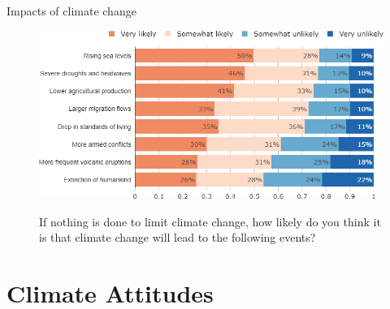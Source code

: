 \documentclass[aspectratio=169,9pt,dvipsnames]{beamer}
\begin{document}
\begin{frame}{Impacts of climate change}%
\begin{figure}[h!]
\centering
\caption{If nothing is done to limit climate change, how likely do you think it is that climate change will lead to the following events?}
\includegraphics[width=.85\textwidth]{../figures/US/CC_impacts_US.png} \\
\end{figure}
\end{frame}

\section{Climate Attitudes}
\end{document}

